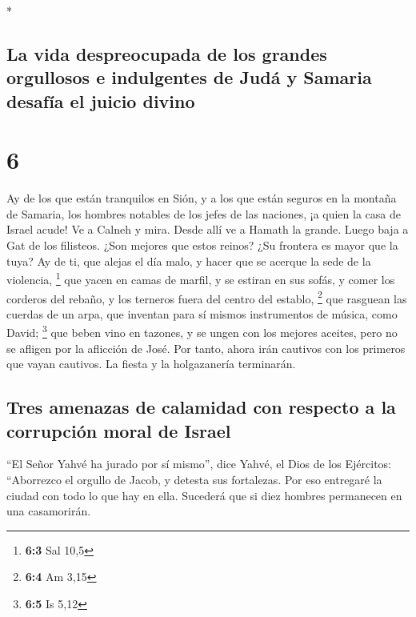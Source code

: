 \begin{paracol}{2}
\begin{otherlanguage}{english}
\end{otherlanguage}

\switchcolumn[0]*

\hypertarget{la-vida-despreocupada-de-los-grandes-orgullosos-e-indulgentes-de-juduxe1-y-samaria-desafuxeda-el-juicio-divino}{%
\subsection{La vida despreocupada de los grandes orgullosos e
indulgentes de Judá y Samaria desafía el juicio
divino}\label{la-vida-despreocupada-de-los-grandes-orgullosos-e-indulgentes-de-juduxe1-y-samaria-desafuxeda-el-juicio-divino}}

\hypertarget{section-10}{%
\section{6}\label{section-10}}

 Ay de los que están tranquilos en Sión, y a los que están
seguros en la montaña de Samaria, los hombres notables de los jefes de
las naciones, ¡a quien la casa de Israel acude!  Ve a
Calneh y mira. Desde allí ve a Hamath la grande. Luego baja a Gat de los
filisteos. ¿Son mejores que estos reinos? ¿Su frontera es mayor que la
tuya?  Ay de ti, que alejas el día malo, y hacer que se
acerque la sede de la violencia, \footnote{\textbf{6:3} Sal 10,5}
 que yacen en camas de marfil, y se estiran en sus sofás,
y comer los corderos del rebaño, y los terneros fuera del centro del
establo, \footnote{\textbf{6:4} Am 3,15}  que rasguean las
cuerdas de un arpa, que inventan para sí mismos instrumentos de música,
como David; \footnote{\textbf{6:5} Is 5,12}  que beben
vino en tazones, y se ungen con los mejores aceites, pero no se afligen
por la aflicción de José.  Por tanto, ahora irán cautivos
con los primeros que vayan cautivos. La fiesta y la holgazanería
terminarán.

\hypertarget{tres-amenazas-de-calamidad-con-respecto-a-la-corrupciuxf3n-moral-de-israel}{%
\subsection{Tres amenazas de calamidad con respecto a la corrupción
moral de
Israel}\label{tres-amenazas-de-calamidad-con-respecto-a-la-corrupciuxf3n-moral-de-israel}}

 ``El Señor Yahvé ha jurado por sí mismo'', dice Yahvé, el
Dios de los Ejércitos: ``Aborrezco el orgullo de Jacob, y detesta sus
fortalezas. Por eso entregaré la ciudad con todo lo que hay en ella.
 Sucederá que si diez hombres permanecen en una
casamorirán.


\end{paracol}
